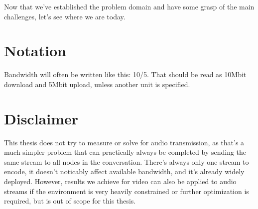 Now that we've established the problem domain and have some grasp of the main challenges, let's see where we are today.


\section{Notation}

Bandwidth will often be written like this: 10/5. That should be read as 10Mbit download and 5Mbit upload, unless another unit is specified.


\section{Disclaimer}

This thesis does not try to measure or solve for audio transmission, as that's a much simpler problem that can practically always be completed by sending the same stream to all nodes in the conversation. There's always only one stream to encode, it doesn't noticably affect available bandwidth, and it's already widely deployed. However, results we achieve for video can also be applied to audio streams if the environment is very heavily constrained or further optimization is required, but is out of scope for this thesis.
